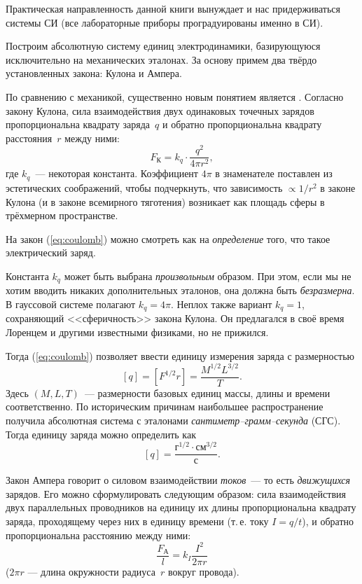 Практическая направленность данной книги вынуждает и нас придерживаться
системы СИ (все лабораторные приборы проградуированы именно в СИ).


Построим абсолютную систему единиц электродинамики, базирующуюся исключительно
на механических эталонах. За основу примем два твёрдо установленных
закона: Кулона и Ампера.

По сравнению с механикой, существенно новым понятием является . Согласно закону Кулона, сила взаимодействия двух одинаковых
точечных зарядов пропорциональна квадрату заряда~$q$ и обратно пропорциональна
квадрату расстояния~$r$ между ними:
\begin{equation}
F_{\text{К}}=k_{q}\cdot\frac{q^{2}}{4\pi r^{2}},\label{eq:coulomb}
\end{equation}
где $k_{q}$~--- некоторая константа. Коэффициент $4\pi$ в знаменателе
поставлен из эстетических соображений,
чтобы подчеркнуть, что зависимость $\propto1/r^{2}$ в законе Кулона
(и в законе всемирного тяготения) возникает как площадь сферы в трёхмерном
пространстве.

На закон (\ref{eq:coulomb}) можно смотреть как на \emph{определение}
того, что такое электрический заряд.

Константа $k_{q}$ может быть выбрана \emph{произвольным} образом.
При этом, если мы не хотим вводить никаких дополнительных эталонов,
она должна быть \emph{безразмерна}. В гауссовой системе
полагают $k_{q}=4\pi$. Неплох также вариант $k_{q}=1$, сохраняющий
<<сферичность>> закона Кулона. Он предлагался в своё время
Лоренцем и другими известными физиками, но не прижился.

Тогда (\ref{eq:coulomb}) позволяет ввести единицу измерения заряда
с размерностью
\[
\left[q\right]=\left[F^{1/2}r\right]=\frac{M^{1/2}L^{3/2}}{T}.
\]
Здесь $\left(M,L,T\right)$~--- размерности базовых единиц массы,
длины и времени соответственно. По историческим причинам наибольшее
распространение получила абсолютная система с эталонами \emph{сантиметр--грамм--секунда}
(СГС). Тогда единицу заряда можно определить как
\[
\left[q\right]=\frac{\text{г}^{1/2}\cdot\text{см}^{3/2}}{\text{с}}.
\]

Закон Ампера говорит о силовом взаимодействии \emph{токов}~--- то
есть \emph{движущихся} зарядов. Его можно сформулировать следующим
образом: сила взаимодействия двух параллельных проводников на единицу их длины
пропорциональна квадрату заряда, проходящему через них в единицу времени
(т.\,е. току $I=q/t$), и обратно пропорциональна расстоянию между ними:
\begin{equation}
\frac{F_{\text{А}}}{l}=k_{I}\frac{I^{2}}{2\pi r}\label{eq:ampere}
\end{equation}
($2\pi r$ --- длина окружности радиуса~$r$ вокруг провода).

